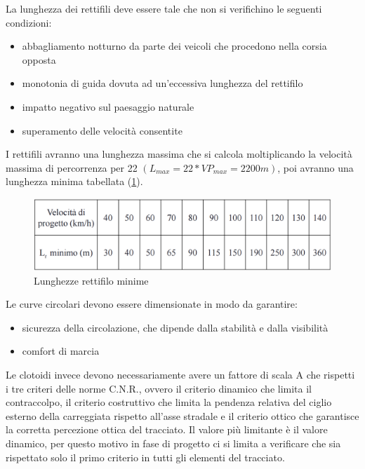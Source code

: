 La lunghezza dei rettifili deve essere tale che non si verifichino le seguenti condizioni:

\begin{itemize}
    \item[\bullet] abbagliamento notturno da parte dei veicoli che procedono nella corsia opposta
    \item[\bullet] monotonia di guida dovuta ad un’eccessiva lunghezza del rettifilo
    \item[\bullet] impatto negativo sul paesaggio naturale
    \item[\bullet] superamento delle velocità consentite
\end{itemize}

I rettifili avranno una lunghezza massima che si calcola moltiplicando la velocità massima di percorrenza per 22 $(L_{max}=22*VP_{max}= 2200m)$, poi avranno una lunghezza minima tabellata (\ref{Lunghezzerettifilominime}).

\begin{figure}[H]
    \includegraphics[width=\textwidth]{Figures/Lunghezze rettifilo minime.png}
      \caption{Lunghezze rettifilo minime}
      \label{Lunghezzerettifilominime}
\end{figure}

Le curve circolari devono essere dimensionate in modo da garantire:

\begin{itemize}
    \item[\bullet] sicurezza della circolazione, che dipende dalla stabilità e dalla visibilità
    \item[\bullet] comfort di marcia
\end{itemize}

Le clotoidi invece devono necessariamente avere un fattore di scala A che rispetti i tre criteri delle norme C.N.R., ovvero il criterio dinamico che limita il contraccolpo, il criterio costruttivo che limita la pendenza relativa del ciglio esterno della carreggiata rispetto all'asse stradale e il criterio ottico che garantisce la corretta percezione ottica del tracciato. Il valore più limitante è il valore dinamico, per questo motivo in fase di progetto ci si limita a verificare che sia rispettato solo il primo criterio in tutti gli elementi del tracciato.

